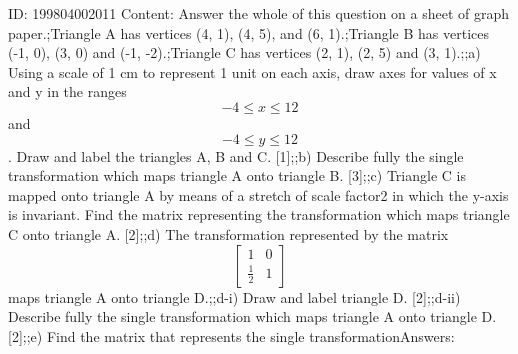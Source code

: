 \documentclass{article}
\begin{document}
ID: 199804002011
Content:
Answer the whole of this question on a sheet of graph paper.;Triangle A has vertices (4, 1), (4, 5), and (6, 1).;Triangle B has vertices (-1, 0), (3, 0) and (-1, -2).;Triangle C has vertices (2, 1), (2, 5) and (3, 1).;;a) Using a scale of 1 cm to represent 1 unit on each axis, draw axes for values of x and y in the ranges $$-4\leq x \leq 12$$ and $$-4\leq y \leq 12$$. Draw and label the triangles A, B and C. [1];;b) Describe fully the single transformation which maps triangle A onto triangle B. [3];;c) Triangle C is mapped onto triangle A by means of a stretch of scale factor2 in which the y-axis is invariant. Find the matrix representing the transformation which maps triangle C onto triangle A. [2];;d) The transformation represented by the matrix $$\begin{bmatrix}1&0\\ \frac{1}{2}&1\end{bmatrix}$$maps triangle A onto triangle D.;;d-i) Draw and label triangle D. [2];;d-ii) Describe fully the single transformation which maps triangle A onto triangle D. [2];;e) Find the matrix that represents the single transformationAnswers:
\end{document}
